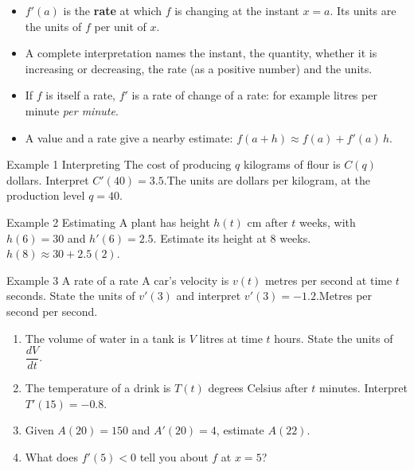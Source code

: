 \documentclass[11pt]{article}
\begin{document}

\begin{ideabox}
\begin{itemize}[leftmargin=*,itemsep=2pt,topsep=2pt]
  \item $f'(a)$ is the \textbf{rate} at which $f$ is changing at the instant $x=a$. Its units are the units of $f$ per unit of $x$.
  \item A complete interpretation names the instant, the quantity, whether it is increasing or decreasing, the rate (as a positive number) and the units.
  \item If $f$ is itself a rate, $f'$ is a rate of change of a rate: for example litres per minute \emph{per minute}.
  \item A value and a rate give a nearby estimate: $f(a+h)\approx f(a)+f'(a)\,h$.
\end{itemize}
\end{ideabox}

\begin{example}{Example 1 \textperiodcentered{} Interpreting}
The cost of producing $q$ kilograms of flour is $C(q)$ dollars. Interpret $C'(40)=3.5$.\soln The units are dollars per kilogram, at the production level $q=40$.
\end{example}

\begin{example}{Example 2 \textperiodcentered{} Estimating}
A plant has height $h(t)$ cm after $t$ weeks, with $h(6)=30$ and $h'(6)=2.5$. Estimate its height at 8 weeks.\soln $h(8)\approx30+2.5(2)$.
\end{example}

\begin{example}{Example 3 \textperiodcentered{} A rate of a rate}
A car's velocity is $v(t)$ metres per second at time $t$ seconds. State the units of $v'(3)$ and interpret $v'(3)=-1.2$.\soln Metres per second per second.
\end{example}

\newpage
{}

\begin{enumerate}[leftmargin=*,itemsep=2pt]
  \item The volume of water in a tank is $V$ litres at time $t$ hours. State the units of $\dfrac{dV}{dt}$.\work{2.3cm}
  \item The temperature of a drink is $T(t)$ degrees Celsius after $t$ minutes. Interpret $T'(15)=-0.8$.\work{2.3cm}
  \item Given $A(20)=150$ and $A'(20)=4$, estimate $A(22)$.\work{2.3cm}
  \item What does $f'(5)<0$ tell you about $f$ at $x=5$?\work{2.3cm}
\end{enumerate}
\end{document}
